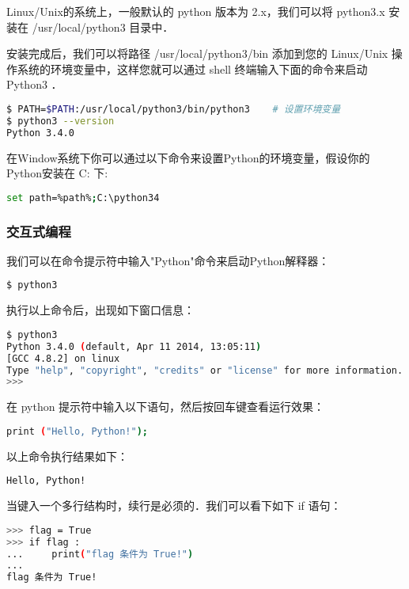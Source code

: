 
Linux/Unix的系统上，一般默认的 python 版本为 2.x，我们可以将 python3.x 安装在 /usr/local/python3 目录中．

安装完成后，我们可以将路径 /usr/local/python3/bin 添加到您的 Linux/Unix 操作系统的环境变量中，这样您就可以通过 shell 终端输入下面的命令来启动 Python3 ．

\begin{lstlisting}[language=bash]
$ PATH=$PATH:/usr/local/python3/bin/python3    # 设置环境变量
$ python3 --version
Python 3.4.0
\end{lstlisting}

在Window系统下你可以通过以下命令来设置Python的环境变量，假设你的Python安装在 C: 下:

\begin{lstlisting}[language=bash]
set path=%path%;C:\python34
\end{lstlisting}

\subsubsection{交互式编程}

我们可以在命令提示符中输入"Python"命令来启动Python解释器：

\begin{lstlisting}[language=bash]
$ python3
\end{lstlisting}

执行以上命令后，出现如下窗口信息：

\begin{lstlisting}[language=bash]
$ python3
Python 3.4.0 (default, Apr 11 2014, 13:05:11) 
[GCC 4.8.2] on linux
Type "help", "copyright", "credits" or "license" for more information.
>>> 
\end{lstlisting}

在 python 提示符中输入以下语句，然后按回车键查看运行效果：

\begin{lstlisting}[language=bash]
print ("Hello, Python!");
\end{lstlisting}

以上命令执行结果如下：

\begin{lstlisting}[language=bash]
Hello, Python!
\end{lstlisting}

当键入一个多行结构时，续行是必须的．我们可以看下如下 if 语句：

\begin{lstlisting}[language=bash]
>>> flag = True
>>> if flag :
...     print("flag 条件为 True!")
... 
flag 条件为 True!
\end{lstlisting}

